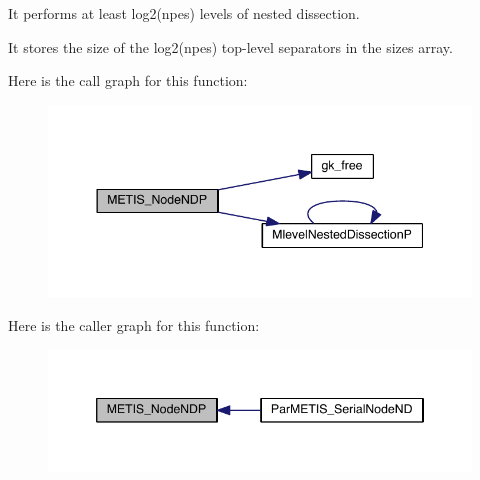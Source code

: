 \begin{DoxyItemize}
\item It performs at least log2(npes) levels of nested dissection.
\item It stores the size of the log2(npes) top-\/level separators in the sizes array. 
\end{DoxyItemize}Here is the call graph for this function\+:\nopagebreak
\begin{figure}[H]
\begin{center}
\leavevmode
\includegraphics[width=344pt]{a00939_a6cb045354f114552086ac2f3ce8d3586_cgraph}
\end{center}
\end{figure}
Here is the caller graph for this function\+:\nopagebreak
\begin{figure}[H]
\begin{center}
\leavevmode
\includegraphics[width=346pt]{a00939_a6cb045354f114552086ac2f3ce8d3586_icgraph}
\end{center}
\end{figure}
\mbox{\label{a00939_a7181616e1bdb4454ac4a54aab65a4fab}} 

